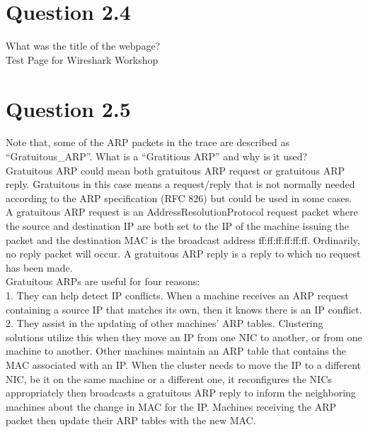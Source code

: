 \documentclass{article}
\newenvironment{homeworkProblem}[1]{
	\section*{#1}
	}{
}
\begin{document}

\begin{homeworkProblem}{Question 2.4}
What was the title of the webpage?\\

Test Page for Wireshark Workshop
\end{homeworkProblem}


\begin{homeworkProblem}{Question 2.5}
Note that, some of the ARP packets in the trace are described as ``Gratuitous\_ARP''. What is a ``Gratitious ARP'' and why is it used?\\

Gratuitous ARP could mean both gratuitous ARP request or gratuitous ARP reply. Gratuitous in this case means a request/reply that is not normally needed according to the ARP specification (RFC 826) but could be used in some cases. A gratuitous ARP request is an AddressResolutionProtocol request packet where the source and destination IP are both set to the IP of the machine issuing the packet and the destination MAC is the broadcast address ff:ff:ff:ff:ff:ff. Ordinarily, no reply packet will occur. A gratuitous ARP reply is a reply to which no request has been made.\\

Gratuitous ARPs are useful for four reasons:\\

1. They can help detect IP conflicts. When a machine receives an ARP request containing a source IP that matches its own, then it knows there is an IP conflict.\\

2. They assist in the updating of other machines' ARP tables. Clustering solutions utilize this when they move an IP from one NIC to another, or from one machine to another. Other machines maintain an ARP table that contains the MAC associated with an IP. When the cluster needs to move the IP to a different NIC, be it on the same machine or a different one, it reconfigures the NICs appropriately then broadcasts a gratuitous ARP reply to inform the neighboring machines about the change in MAC for the IP. Machines receiving the ARP packet then update their ARP tables with the new MAC.\\


\end{homeworkProblem}
\end{document}

